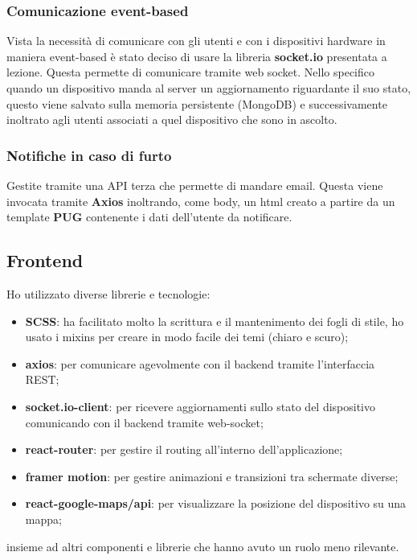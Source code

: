 \documentclass{report}
\begin{document}
\subsubsection{Comunicazione event-based}
Vista la necessità di comunicare con gli utenti e con i dispositivi hardware in maniera event-based è stato deciso di usare la libreria \textbf{socket.io} presentata a lezione. Questa permette di comunicare tramite web socket. Nello specifico quando un dispositivo manda al server un aggiornamento riguardante il suo stato, questo viene salvato sulla memoria persistente (MongoDB) e successivamente inoltrato agli utenti associati a quel dispositivo che sono in ascolto.

\subsubsection{Notifiche in caso di furto}
Gestite tramite una API terza che permette di mandare email. Questa viene invocata tramite \textbf{Axios} inoltrando, come body, un html creato a partire da un template \textbf{PUG} contenente i dati dell'utente da notificare.

\subsection{Frontend}
Ho utilizzato diverse librerie e tecnologie:
\begin{itemize}
    \item \textbf{SCSS}: ha facilitato molto la scrittura e il mantenimento dei fogli di stile, ho usato i mixins per creare in modo facile dei temi (chiaro e scuro);
    \item \textbf{axios}: per comunicare agevolmente con il backend tramite l'interfaccia REST;
    \item \textbf{socket.io-client}: per ricevere aggiornamenti sullo stato del dispositivo comunicando con il backend tramite web-socket;
    \item \textbf{react-router}: per gestire il routing all'interno dell'applicazione;
    \item \textbf{framer motion}: per gestire animazioni e transizioni tra schermate diverse;
    \item \textbf{react-google-maps/api}: per visualizzare la posizione del dispositivo su una mappa;
\end{itemize}
insieme ad altri componenti e librerie che hanno avuto un ruolo meno rilevante.
\end{document}

